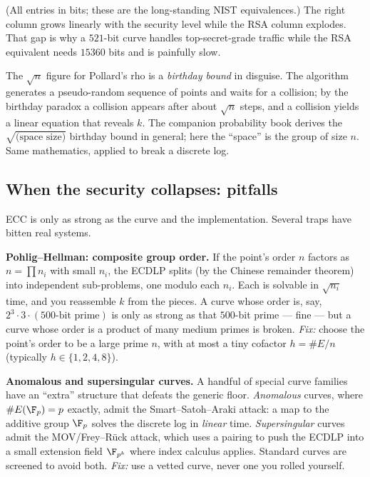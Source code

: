 (All entries in bits; these are the long-standing NIST equivalences.) The right column
grows linearly with the security level while the RSA column explodes. That gap is why a
$521$-bit curve handles top-secret-grade traffic while the RSA equivalent needs
$15360$ bits and is painfully slow.

\begin{connectionbox}
The $\sqrt n$ figure for Pollard's rho is a \emph{birthday bound} in disguise. The
algorithm generates a pseudo-random sequence of points and waits for a collision; by the
birthday paradox a collision appears after about $\sqrt n$ steps, and a collision yields
a linear equation that reveals $k$. The companion probability book derives the
$\sqrt{\text{(space size)}}$ birthday bound in general; here the ``space'' is the group
of size $n$. Same mathematics, applied to break a discrete log.
\end{connectionbox}

\subsection{When the security collapses: pitfalls}
\label{ch21:pitfalls}

ECC is only as strong as the curve and the implementation. Several traps have bitten
real systems.

\begin{attackbox}
\textbf{Pohlig--Hellman: composite group order.} If the point's order $n$ factors as
$n = \prod n_i$ with small $n_i$, the ECDLP splits (by the Chinese remainder theorem)
into independent sub-problems, one modulo each $n_i$. Each is solvable in $\sqrt{n_i}$
time, and you reassemble $k$ from the pieces. A curve whose order is, say,
$2^3 \cdot 3 \cdot (\text{500-bit prime})$ is only as strong as that $500$-bit prime ---
fine --- but a curve whose order is a product of many medium primes is broken. \emph{Fix:}
choose the point's order to be a large prime $n$, with at most a tiny cofactor
$h = \#E/n$ (typically $h \in \{1,2,4,8\}$).
\end{attackbox}

\begin{attackbox}
\textbf{Anomalous and supersingular curves.} A handful of special curve families have an
``extra'' structure that defeats the generic floor. \emph{Anomalous} curves, where
$\#E(\F_p) = p$ exactly, admit the Smart--Satoh--Araki attack: a map to the additive
group $\F_p$ solves the discrete log in \emph{linear} time. \emph{Supersingular} curves
admit the MOV/Frey--R\"uck attack, which uses a pairing to push the ECDLP into a small
extension field $\F_{p^k}$ where index calculus applies. Standard curves are screened to
avoid both. \emph{Fix:} use a vetted curve, never one you rolled yourself.
\end{attackbox}

